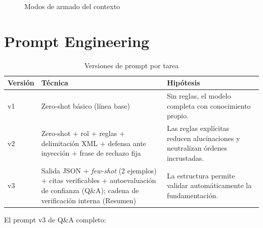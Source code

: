 \begin{figure}[H]\centering
{}
\caption{Modos de armado del contexto}\label{fig:contexto-modos}
\end{figure}

\section{Prompt Engineering}
\begin{table}[H]\centering\small
\caption{Versiones de prompt por tarea}\label{tab:prompts}
\begin{tabularx}{\linewidth}{@{}l X X@{}}\toprule
Versión & Técnica & Hipótesis\\\midrule
v1 & Zero-shot básico (línea base) & Sin reglas, el modelo completa con conocimiento propio.\\
v2 & Zero-shot + rol + reglas + delimitación XML + defensa ante inyección + frase de rechazo fija & Las reglas
explícitas reducen alucinaciones y neutralizan órdenes incrustadas.\\
v3 & Salida JSON + \emph{few-shot} (2 ejemplos) + citas verificables + autoevaluación de confianza (Q\&A);
cadena de verificación interna (Resumen) & La estructura permite validar automáticamente la fundamentación.\\\bottomrule
\end{tabularx}
\end{table}
El prompt v3 de Q\&A completo:


